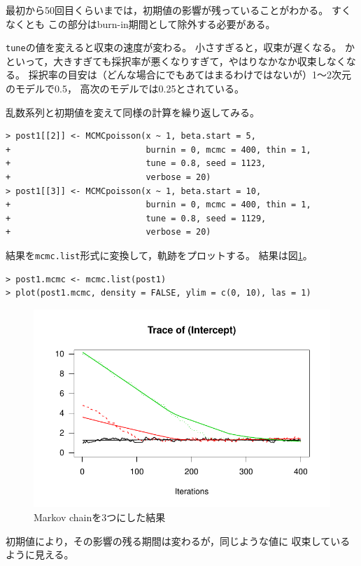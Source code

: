 \documentclass[11pt,uplatex]{jsarticle}
\begin{document}
最初から50回目くらいまでは，初期値の影響が残っていることがわかる。
すくなくとも この部分はburn-in期間として除外する必要がある。

\texttt{tune}の値を変えると収束の速度が変わる。
小さすぎると，収束が遅くなる。
かといって，大きすぎても採択率が悪くなりすぎて，やはりなかなか収束しなくなる。
採択率の目安は（どんな場合にでもあてはまるわけではないが）1〜2次元のモデルで0.5，
高次のモデルでは0.25とされている\cite{IMCMR}。



乱数系列と初期値を変えて同様の計算を繰り返してみる。

\begin{lstlisting}
> post1[[2]] <- MCMCpoisson(x ~ 1, beta.start = 5,
+                           burnin = 0, mcmc = 400, thin = 1,
+                           tune = 0.8, seed = 1123,
+                           verbose = 20)
> post1[[3]] <- MCMCpoisson(x ~ 1, beta.start = 10,
+                           burnin = 0, mcmc = 400, thin = 1,
+                           tune = 0.8, seed = 1129,
+                           verbose = 20)
\end{lstlisting}
%
結果を\texttt{mcmc.list}形式に変換して，軌跡をプロットする。
結果は図\ref{MCMC3}。

\begin{lstlisting}
> post1.mcmc <- mcmc.list(post1)
> plot(post1.mcmc, density = FALSE, ylim = c(0, 10), las = 1)
\end{lstlisting}
%

\begin{figure}[hbtp]
  \begin{center}
    \includegraphics[bb=0 0 360 240, clip, width=260 bp]{example1-2.pdf}
  \end{center}
  \caption{Markov chainを3つにした結果}
  \label{MCMC3}
\end{figure}\noindent
初期値により，その影響の残る期間は変わるが，同じような値に
収束しているように見える。
\end{document}
